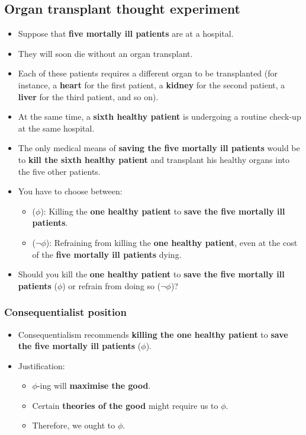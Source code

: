 \documentclass[11pt]{article}
\begin{document}
\subsection{Organ transplant thought experiment}
\label{sec:orgcacc3f1}
\begin{itemize}
\item Suppose that \textbf{five mortally ill patients} are at a hospital.
\item They will soon die without an organ transplant.
\item Each of these patients requires a different organ to be transplanted (for instance, a \textbf{heart} for the first patient, a \textbf{kidney} for the second patient, a \textbf{liver} for the third patient, and so on).
\item At the same time, a \textbf{sixth healthy patient} is undergoing a routine check-up at the same hospital.
\item The only medical means of \textbf{saving the five mortally ill patients} would be to \textbf{kill the sixth healthy patient} and transplant his healthy organs into the five other patients.
\item You have to choose between:
\begin{itemize}
\item (\(\phi\)): Killing the \textbf{one healthy patient} to \textbf{save the five mortally ill patients}.
\item (\(\neg \phi\)): Refraining from killing the \textbf{one healthy patient}, even at the cost of the \textbf{five mortally ill patients} dying.
\end{itemize}
\item Should you kill the \textbf{one healthy patient} to \textbf{save the five mortally ill patients} (\(\phi\)) or refrain from doing so (\(\neg \phi\))?
\end{itemize}
\subsubsection{Consequentialist position}
\label{sec:org37f0d66}
\begin{itemize}
\item Consequentialism recommends \textbf{killing the one healthy patient} to \textbf{save the five mortally ill patients} (\(\phi\)).
\item Justification:
\begin{itemize}
\item \(\phi\)-ing will \textbf{maximise the good}.
\item Certain \textbf{theories of the good} might require us to \(\phi\).
\item Therefore, we ought to \(\phi\).
\end{itemize}
\end{itemize}
\end{document}
